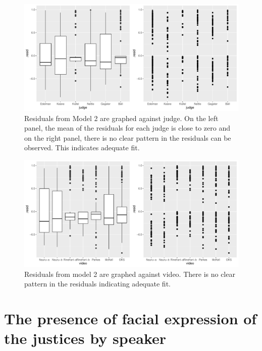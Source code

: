 \documentclass{monashthesis}
\begin{document}
\begin{figure}

{\centering \includegraphics[width=1\linewidth]{figures/resid-judge-1} 

}

\caption{Residuals from Model 2 are graphed against judge. On the left panel, the mean of the residuals for each judge is close to zero and on the right panel, there is no clear pattern in the residuals can be observed. This indicates adequate fit.}\label{fig:resid-judge}
\end{figure}

\begin{figure}

{\centering \includegraphics[width=1\linewidth]{figures/resid-video-1} 

}

\caption{Residuals from model 2 are graphed against video. There is no clear pattern in the residuals indicating adequate fit.}\label{fig:resid-video}
\end{figure}

\hypertarget{the-presence-of-facial-expression-of-the-justices-by-speaker}{%
\section{The presence of facial expression of the justices by speaker}\label{the-presence-of-facial-expression-of-the-justices-by-speaker}}
\end{document}
